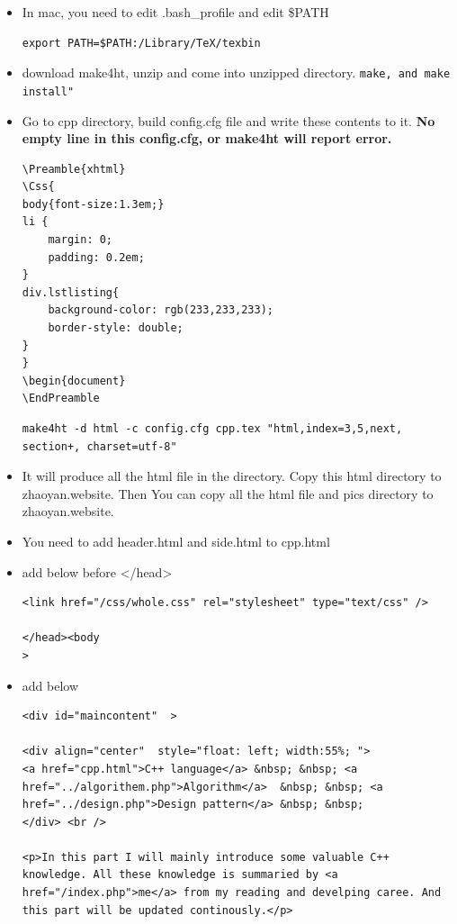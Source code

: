\documentclass[a4paper,12pt,twoside]{book}
\begin{document}
\begin{itemize}
\item In mac, you need to edit .bash\_profile and edit \$PATH
\begin{verbatim}
export PATH=$PATH:/Library/TeX/texbin
\end{verbatim}

\item download make4ht, unzip and come into unzipped directory. 
\verb=make, and make install"=

\item Go to cpp directory, build config.cfg file and write these contents to it. \textbf{No empty line in this config.cfg, or make4ht will report error.}
\begin{verbatim}
\Preamble{xhtml}
\Css{
body{font-size:1.3em;}
li {
    margin: 0;
    padding: 0.2em;
}
div.lstlisting{
    background-color: rgb(233,233,233); 
    border-style: double;
}
}
\begin{document}
\EndPreamble

\end{verbatim}

\begin{verbatim}
make4ht -d html -c config.cfg cpp.tex "html,index=3,5,next, section+, charset=utf-8" 
\end{verbatim}

\item It will produce all the html file in the directory. Copy this html directory to zhaoyan.website.  Then You can copy all the html file and pics directory to zhaoyan.website. 

\item You need to add header.html and side.html to cpp.html

\item  add below before </head>
\begin{verbatim}
<link href="/css/whole.css" rel="stylesheet" type="text/css" />    
    
</head><body 
>
\end{verbatim}

\item add below 

\begin{verbatim}
<div id="maincontent"  >

<div align="center"  style="float: left; width:55%; ">
<a href="cpp.html">C++ language</a> &nbsp; &nbsp; <a href="../algorithem.php">Algorithm</a>  &nbsp; &nbsp; <a href="../design.php">Design pattern</a> &nbsp; &nbsp;
</div> <br />

<p>In this part I will mainly introduce some valuable C++ knowledge. All these knowledge is summaried by <a href="/index.php">me</a> from my reading and develping caree. And this part will be updated continously.</p>



\end{verbatim}
\end{itemize}
\end{document}
